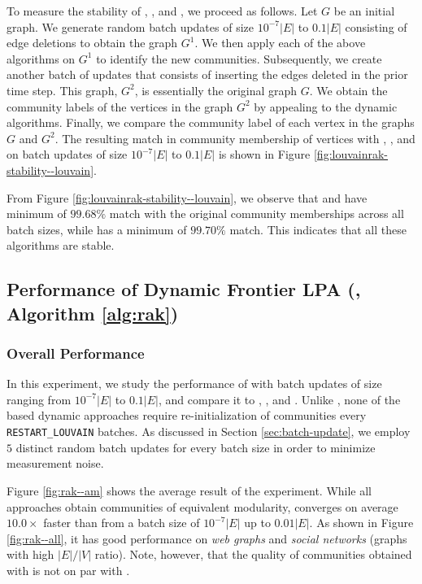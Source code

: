 To measure the stability of \NaiLou{}, \DelLou{}, and \FroLou{}, we proceed as follows. Let $G$ be an initial graph. We generate random batch updates of size $10^{-7} |E|$ to $0.1 |E|$ consisting of edge deletions to obtain the graph $G^1$. We then apply each of the above algorithms on $G^1$ to identify the new communities. Subsequently, we create another batch of updates that consists of inserting the edges deleted in the prior time step. This graph, $G^2$, is essentially the original graph $G$. We obtain the community labels of the vertices in the graph $G^2$ by appealing to the dynamic algorithms. Finally, we compare the community label of each vertex in the graphs $G$ and $G^2$. The resulting match in community membership of vertices with \NaiLou{}, \DelLou{}, and \FroLou{} on batch updates of size $10^{-7} |E|$ to $0.1 |E|$ is shown in Figure \ref{fig:louvainrak-stability--louvain}.

From Figure \ref{fig:louvainrak-stability--louvain}, we observe that\NaiLou{} and \DelLou{} have minimum of $99.68\%$ match with the original community memberships across all batch sizes, while \FroLou{} has a minimum of $99.70\%$ match. This indicates that all these algorithms are stable.




\subsection{Performance of Dynamic Frontier LPA (\FroLPA{}, Algorithm \ref{alg:rak})}
\label{sec:rak-evaluation}

\subsubsection{Overall Performance}

In this experiment, we study the performance of \FroLPA{} with batch updates of size ranging from $10^{-7} |E|$ to $0.1 |E|$, and compare it to \StaLPA{}, \NaiLPA{}, and \DelLPA{}. Unlike \Lou{}, none of the \LPA{} based dynamic approaches require re-initialization of communities every \verb|RESTART_LOUVAIN| batches. As discussed in Section \ref{sec:batch-update}, we employ $5$ distinct random batch updates for every batch size in order to minimize measurement noise.

Figure \ref{fig:rak--am} shows the average result of the experiment. While all approaches obtain communities of equivalent modularity, \FroLPA{} converges on average $10.0\times$ faster than \NaiLPA{} from a batch size of $10^{-7} |E|$ up to $0.01 |E|$. As shown in Figure \ref{fig:rak--all}, it has good performance on \textit{web graphs} and \textit{social networks} (graphs with high $|E|/|V|$ ratio). Note, however, that the quality of communities obtained with \LPA{} is not on par with \Lou{}.

